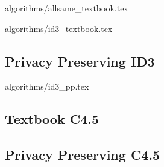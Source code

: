 {algorithms/allsame_textbook.tex}

{algorithms/id3_textbook.tex}



\subsection{Privacy Preserving ID3}\label{s:pp-id3}



{algorithms/id3_pp.tex}




\subsection{Textbook C4.5}\label{s:c45}

\subsection{Privacy Preserving C4.5}\label{s:pp-c45}


